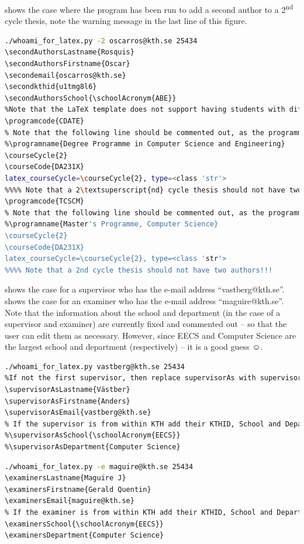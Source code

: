  shows the case where the program has been run to add a second author to a 2\textsuperscript{nd} cycle thesis, note the warning message in the last line of this figure.

\begin{lstlisting}[language={bash}, caption={Attempting to generate a 2\textsuperscript{nd} author for a 2\textsuperscript{nd} cycle thesis}, label=lst:secondAuthor]
./whoami_for_latex.py -2 oscarros@kth.se 25434
\secondAuthorsLastname{Rosquis}
\secondAuthorsFirstname{Oscar}
\secondemail{oscarros@kth.se}
\secondkthid{u1tmg8l6}
\secondAuthorsSchool{\schoolAcronym{ABE}}
%Note that the LaTeX template does not support having students with different programs or course codes
\programcode{CDATE}
% Note that the following line should be commented out, as the programme is derived from the school_and\_Programs.ins information
%\programname{Degree Programme in Computer Science and Engineering}
\courseCycle{2}
\courseCode{DA231X}
latex_courseCycle=\courseCycle{2}, type=<class 'str'>
%%%% Note that a 2\textsuperscript{nd} cycle thesis should not have two authors!!!
\programcode{TCSCM}
% Note that the following line should be commented out, as the programme is derived from the school_andPorgrams.ins information
%\programname{Master's Programme, Computer Science}
\courseCycle{2}
\courseCode{DA231X}
latex_courseCycle=\courseCycle{2}, type=<class 'str'>
%%%% Note that a 2nd cycle thesis should not have two authors!!!
\end{lstlisting}

 shows the case for a supervisor who has the e-mail address “vastberg@kth.se”.   shows the case for an examiner who has the e-mail address “maguire@kth.se”.  Note that the information about the school and department (in the case of a supervisor and examiner) are currently fixed and commented out – so that the user can edit them as necessary. However, since EECS and Computer Science are the largest school and department (respectively) – it is a good guess ☺.
\begin{lstlisting}[language={bash}, caption={Generating \LaTeX~commands for a supervisor}, label=lst:supervisor]
./whoami_for_latex.py vastberg@kth.se 25434
%If not the first supervisor, then replace supervisorAs with supervisorBs or supervisorDCAs as appropriate
\supervisorAsLastname{Västber}
\supervisorAsFirstname{Anders}
\supervisorAsEmail{vastberg@kth.se}
% If the supervisor is from within KTH add their KTHID, School and Department info
%\supervisorAsSchool{\schoolAcronym{EECS}}
%\supervisorAsDepartment{Computer Science}
\end{lstlisting}
\begin{lstlisting}[language={bash}, caption={Generating \LaTeX~commands for the examiner}, label=lst:examiner]
./whoami_for_latex.py -e maguire@kth.se 25434
\examinersLastname{Maguire J}
\examinersFirstname{Gerald Quentin}
\examinersEmail{maguire@kth.se}
% If the examiner is from within KTH add their KTHID, School and Department info
\examinersSchool{\schoolAcronym{EECS}}
\examinersDepartment{Computer Science}
\end{lstlisting}
 	
